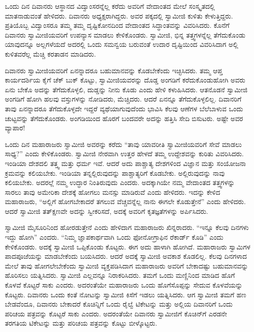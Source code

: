  ಒಂದು ದಿನ ದಿವಾನರು ಆಸ್ಥಾನದ ವಿದ್ವಾಂಸರನ್ನೆಲ್ಲ ಕರೆದು ಅವರಿಗೆ ವೇದಾಂತದ ಮೇಲೆ ಸಂಸ್ಕೃತದಲ್ಲಿ ಮಾತನಾಡುವಂತೆ ಹೇಳಿದರು. ದಿವಾನರು ಅಧ್ಯಕ್ಷರಾಗಿದ್ದರು. ಅವರ ಪಕ್ಕದಲ್ಲಿ ಸ್ವಾಮೀಜಿ ಕುಳಿತು ಕೇಳುತ್ತಿದ್ದರು. ಪ್ರತಿಯೊಬ್ಬ ವಿದ್ವಾಂಸರೂ ತಮ್ಮ ತಮ್ಮ ದೃಷ್ಟಿಕೋನದಿಂದ ವೇದಾಂತದ ಸಿದ್ಧಾಂತವನ್ನು ವಿವರಿಸಿದರು. ಕೊನೆಗೆ ದಿವಾನರು ಸ್ವಾಮೀಜಿಯವರಿಗೆ ಉಪನ್ಯಾಸ ಮಾಡಲು ಕೇಳಿಕೊಂಡರು. ಸ್ವಾಮೀಜಿ, ಭಿನ್ನ ತತ್ತ್ವಗಳನ್ನೆಲ್ಲ ತೆಗೆದುಕೊಂಡು ಯಾವುದನ್ನೂ ಅಲ್ಲಗಳೆಯದೆ ಅದರಲ್ಲಿ ಒಂದು ಸಮನ್ವಯ ಬರುವಂತೆ ಉದಾರ ದೃಷ್ಟಿಯಿಂದ ವಿವರಿಸಿದಾಗ ಅಲ್ಲಿ ಕುಳಿತವರೆಲ್ಲ ಮೆಚ್ಚಿ ಕರತಾಡನ ಮಾಡಿದರು. 

 ದಿವಾನರು ಸ್ವಾಮೀಜಿಯವರಿಗೆ ಏನನ್ನಾದರೂ ಬಹುಮಾನವನ್ನು ಕೊಡಬೇಕೆಂದು ಇಚ್ಛಿಸಿದರು. ತಮ್ಮ ಆಪ್ತ ಕಾರ್ಯದರ್ಶಿಯ ಕೈಗೆ ಚೆಕ್ ಬುಕ್ ಕೊಟ್ಟು, ಸ್ವಾಮೀಜಿಯವರನ್ನು ದೊಡ್ಡ ಅಂಗಡಿಗೆ ಕರೆದುಕೊಂಡುಹೋಗಿ ಅವರು ಏನು ಬೇಕೊ ಅದನ್ನು ತೆಗೆದುಕೊಳ್ಳಲಿ, ದುಡ್ಡನ್ನು ನೀನು ಕೊಡು ಎಂದು ಹೇಳಿ ಕಳುಹಿಸಿದರು. ಆತನೊಡನೆ ಸ್ವಾಮೀಜಿ ಅಂಗಡಿಗೆ ಹೋಗಿ ಹಲವು ವಸ್ತುಗಳನ್ನು ನೋಡಿದರು, ಮೆಚ್ಚಿದರು. ಆದರೆ ಏನನ್ನೂ ತೆಗೆದುಕೊಳ್ಳಲಿಲ್ಲ. ದಿವಾನರಿಗೆ ತಾವು ಏನನ್ನಾದರೂ ತೆಗೆದುಕೊಳ್ಳದೇ ಇದ್ದರೆ ವ್ಯಥೆಯಾಗುವುದೆಂದು ಭಾವಿಸಿ ಕೆಲವು ಆಣೆಗಳ ಬೆಲೆಬಾಳುವ ಒಂದು ಚುಟ್ಟವನ್ನು ತೆಗೆದುಕೊಂಡರು. ಅಂಗಡಿಯಿಂದ ಹೊರಗೆ ಬಂದವರೇ ಅದನ್ನು ಹತ್ತಿಸಿ ಸೇದಿ ಬಿಸುಟರು. ಅಷ್ಟೇ ಅವರ ವ್ಯಾಪಾರ! 

 ಒಂದು ದಿನ ಮಹಾರಾಜರು ಸ್ವಾಮೀಜಿ ಅವರನ್ನು ಕರೆದು “ತಾವು ಯಾವರೀತಿ ಸ್ವಾಮೀಜಿಯವರಿಗೆ ಸೇವೆ ಮಾಡಲು ಸಾಧ್ಯ?” ಎಂದು ಕೇಳಿಕೊಂಡರು. ಸ್ವಾಮೀಜಿ ನೇರವಾಗಿ ಉತ್ತರ ಹೇಳದೆ ತಮ್ಮ ಉದ್ದೇಶವನ್ನು ಕುರಿತು ವಿವರಿಸಿದರು. ಇಂಡಿಯಾ ದೇಶದಲಿ ತತ್ತ್ವ ಮತ್ತು ಧರ್ಮ ಇವೆ. ಆದರೆ ಅದು ಪಾಶ್ಚಾತ್ಯ ದೇಶಗಳಿಂದ ವಿಜ್ಞಾನ ಮತ್ತು ಸಂಯೋಜನಾ ಕ್ರಮವನ್ನು ಕಲಿಯಬೇಕು. ಇಂಡಿಯಾ ತನ್ನಲ್ಲಿರುವುದನ್ನು ಪಾಶ್ಚಾತ್ಯರಿಗೆ ಕೊಡಬೇಕು. ಅಲ್ಲಿರುವುದನ್ನು ನಾವು ಕಲಿಯಬೇಕು. ಅದರಲ್ಲೆ ನಮ್ಮ ಉದ್ಧಾರ ನಿಂತಿರುವುದು ಎಂದರು. ಅದಕ್ಕಾಗಿಯೇ ನಮ್ಮ ವೇದಾಂತದ ತತ್ತ್ವಗಳನ್ನು ಸಾರಲು ತಾವು ಅಮೇರಿಕಾ ದೇಶಕ್ಕೆ ಹೋಗಲು ಮನಸ್ಸು ಮಾಡಿರುವೆ ಎಂದು ಹೇಳಿದರು. ಇದನ್ನು ಕೇಳಿದ ಮಹಾರಾಜರು, “ಅಲ್ಲಿಗೆ ಹೋಗಬೇಕಾದರೆ ತಗಲುವ ವೆಚ್ಚವನ್ನೆಲ್ಲ ನಾನು ಈಗಲೇ ಕೊಡುತ್ತೇನೆ” ಎಂದು ಹೇಳಿದರು. ಆದರೆ ಸ್ವಾಮೀಜಿ ತತ್‍ಕ್ಷಣವೇ ಅದನ್ನು ಸ್ವೀಕರಿಸದೆ, ಅದಕ್ಕೆ ಅವರಿಗೆ ಕೃತಜ್ಞತೆಗಳನ್ನು ಅರ್ಪಿಸಿದರು. 

 ಸ್ವಾಮೀಜಿ ಮೈಸೂರಿನಿಂದ ಹೋರಡುತ್ತೇನೆ ಎಂದು ಹೇಳಿದಾಗ ಮಹಾರಾಜರು ಖಿನ್ನರಾದರು. “ಇನ್ನೂ ಕೆಲವು ದಿನಗಳು ಇದ್ದು ಹೋಗಿ” ಎಂದರು. “ನಿಮ್ಮ ಜ್ಞಾಪಕಾರ್ಥವಾಗಿ ಒಂದು ಫೋನೋಗ್ರಾಫಿನ ರೆಕಾರ್ಡ್ ಕೊಡಿ” ಎಂದು ಕೇಳಿಕೊಂಡರು. ಅದಕ್ಕೆ ಸ್ವಾಮೀಜಿ ಒಪ್ಪಿಕೊಂಡು ಕೊಟ್ಟರು. ಈಗ ಅದು ಹಾಳಾಗಿ ಹೋಗಿದೆ. ಮಹಾರಾಜರು ಸ್ವಾಮಿಗಳ ಪಾದಪೂಜೆಯನ್ನು ಮಾಡಬೇಕೆಂದು ಬಯಸಿದರು. ಆದರೆ ಅದಕ್ಕೆ ಸ್ವಾಮೀಜಿ ಅವಕಾಶ ಕೊಡಲಿಲ್ಲ. ಕೆಲವು ದಿನಗಳಾದ ಮೇಲೆ ತಾವು ಹೋಗಲೇಬೇಕೆಂದು ಸ್ವಾಮೀಜಿ ವ್ಯಕ್ತಪಡಿಸಿದಾಗ ಮಹಾರಾಜರು ಅವರಿಗೆ ಬೇಕಾದಷ್ಟು ಬಹುಮಾನವನ್ನು ಹೊರಿಸಲು ಯತ್ನಿಸಿದರು. ಸ್ವಾಮೀಜಿ ಎಲ್ಲವನ್ನೂ ನಿರಾಕರಿಸಿದರು. ತಮಗೆ ಒಂದು ಮಣ್ಣಿನಿಂದ ಮಾಡಿದ ಹೊಗೆ ಕೊಳವೆ ಕೊಟ್ಟರೆ ಸಾಕು ಎಂದರು. ಅದರಂತೆಯೇ ಮಹಾರಾಜರು ಒಂದು ಹೊಗೆಸೊಪ್ಪನ್ನು ಸೇದುವ ಕೊಳವೆಯನ್ನು ಕೊಟ್ಟರು. ದಿವಾನರು ಒಂದು ಕಂತೆ ನೋಟನ್ನು ಸ್ವಾಮೀಜಿ ಕಿಸೆಗೆ ಇಡಲು ಯತ್ನಿಸಿದರು. ಆಗ ಸ್ವಾಮೀಜಿ ತಮಗೆ ಹಣ ಬೇಡವೆಂದೂ, ದಿವಾನರು ಬೇಕಾದರೆ ಕೊಚಿನ್ನಿಗೆ ಒಂದು ರೈಲ್ವೆ ಟಿಕೇಟನ್ನು ಮತ್ತು ಅಲ್ಲಿಯ ದಿವಾನರಿಗೆ ಒಂದು ಪರಿಚಯ ಪತ್ರವನ್ನು ಕೊಟ್ಟರೆ ಸಾಕು ಎಂದರು. ಅದರಂತೆಯೇ ದಿವಾನರು ಸ್ವಾಮೀಜಿಗೆ ಕೊಚಿನ್‍ಗೆ ಎರಡನೇ ತರಗತಿಯ ಟಿಕೇಟನ್ನು ಮತ್ತು ಪರಿಚಯ ಪತ್ರವನ್ನು ಕೊಟ್ಟು ಬೀಳ್ಕೊಟ್ಟರು. 

